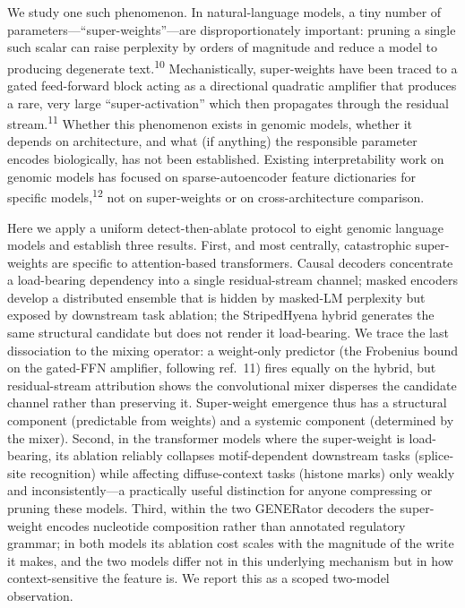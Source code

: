 \documentclass[11pt]{article}
\begin{document}
We study one such phenomenon. In natural-language models, a tiny number
of parameters---``super-weights''---are disproportionately important:
pruning a single such scalar can raise perplexity by orders of
magnitude and reduce a model to producing degenerate
text.\textsuperscript{10} Mechanistically, super-weights have been
traced to a gated feed-forward block acting as a directional quadratic
amplifier that produces a rare, very large ``super-activation'' which
then propagates through the residual stream.\textsuperscript{11}
Whether this phenomenon exists in genomic models, whether it depends on
architecture, and what (if anything) the responsible parameter encodes
biologically, has not been established. Existing interpretability work
on genomic models has focused on sparse-autoencoder feature
dictionaries for specific models,\textsuperscript{12} not on
super-weights or on cross-architecture comparison.

Here we apply a uniform detect-then-ablate protocol to eight genomic
language models and establish three results. First, and most centrally,
catastrophic super-weights are specific to attention-based
transformers. Causal decoders concentrate a load-bearing dependency
into a single residual-stream channel; masked encoders develop a
distributed ensemble that is hidden by masked-LM perplexity but exposed
by downstream task ablation; the StripedHyena hybrid generates the same
structural candidate but does not render it load-bearing. We trace the
last dissociation to the mixing operator: a weight-only predictor (the
Frobenius bound on the gated-FFN amplifier, following
ref.~11) fires equally on the hybrid, but residual-stream attribution
shows the convolutional mixer disperses the candidate channel rather
than preserving it. Super-weight emergence thus has a structural
component (predictable from weights) and a systemic component
(determined by the mixer). Second, in the transformer models where the
super-weight is load-bearing, its ablation reliably collapses
motif-dependent downstream tasks (splice-site recognition) while
affecting diffuse-context tasks (histone marks) only weakly and
inconsistently---a practically useful distinction for anyone
compressing or pruning these models. Third, within the two GENERator
decoders the super-weight encodes nucleotide composition rather than
annotated regulatory grammar; in both models its ablation cost scales
with the magnitude of the write it makes, and the two models differ not
in this underlying mechanism but in how context-sensitive the feature
is. We report this as a scoped two-model observation.
\end{document}
